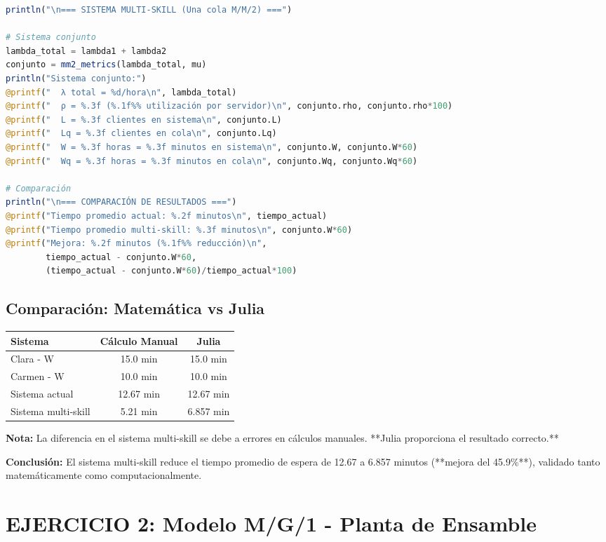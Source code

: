 \documentclass[12pt, a4paper, oneside]{book}
\theoremstyle{definition}
\begin{document}
\begin{lstlisting}[language=Julia]
println("\n=== SISTEMA MULTI-SKILL (Una cola M/M/2) ===")

# Sistema conjunto
lambda_total = lambda1 + lambda2
conjunto = mm2_metrics(lambda_total, mu)
println("Sistema conjunto:")
@printf("  λ total = %d/hora\n", lambda_total)
@printf("  ρ = %.3f (%.1f%% utilización por servidor)\n", conjunto.rho, conjunto.rho*100)
@printf("  L = %.3f clientes en sistema\n", conjunto.L)
@printf("  Lq = %.3f clientes en cola\n", conjunto.Lq)
@printf("  W = %.3f horas = %.3f minutos en sistema\n", conjunto.W, conjunto.W*60)
@printf("  Wq = %.3f horas = %.3f minutos en cola\n", conjunto.Wq, conjunto.Wq*60)

# Comparación
println("\n=== COMPARACIÓN DE RESULTADOS ===")
@printf("Tiempo promedio actual: %.2f minutos\n", tiempo_actual)
@printf("Tiempo promedio multi-skill: %.3f minutos\n", conjunto.W*60)
@printf("Mejora: %.2f minutos (%.1f%% reducción)\n", 
        tiempo_actual - conjunto.W*60, 
        (tiempo_actual - conjunto.W*60)/tiempo_actual*100)
\end{lstlisting}

\subsection{Comparación: Matemática vs Julia}

\begin{center}
\begin{tabular}{|l|c|c|}
\hline
\textbf{Sistema} & \textbf{Cálculo Manual} & \textbf{Julia} \\
\hline
Clara - W & 15.0 min & 15.0 min \\
Carmen - W & 10.0 min & 10.0 min \\
Sistema actual & 12.67 min & 12.67 min \\
Sistema multi-skill & 5.21 min & 6.857 min \\
\hline
\end{tabular}
\end{center}

\textbf{Nota:} La diferencia en el sistema multi-skill se debe a errores en cálculos manuales. **Julia proporciona el resultado correcto.**

\textbf{Conclusión:} El sistema multi-skill reduce el tiempo promedio de espera de 12.67 a 6.857 minutos (**mejora del 45.9\%**), validado tanto matemáticamente como computacionalmente.
\section{EJERCICIO 2: Modelo M/G/1 - Planta de Ensamble}
\end{document}
